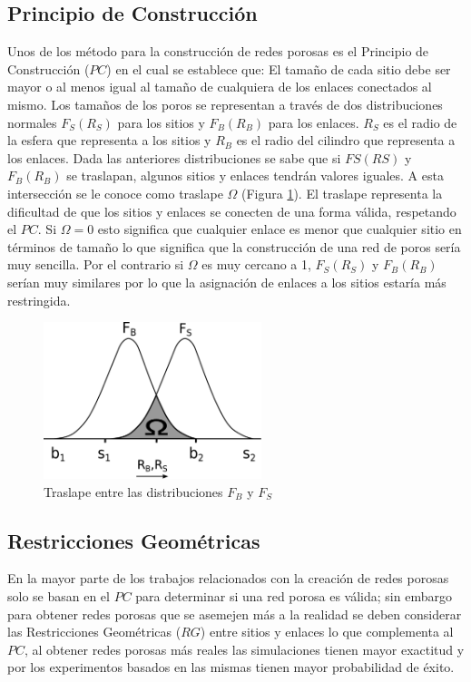 \subsection{Principio de Construcción}
Unos de los método para la construcción de redes porosas es el Principio de Construcción ($PC$) en el cual se establece que: El tamaño de cada sitio debe ser mayor o al menos igual al tamaño de cualquiera de los enlaces conectados al mismo. Los tamaños de los poros se representan a través de dos distribuciones normales $F_S(R_S)$ para los sitios y $F_B(R_B)$ para los enlaces. $R_S$ es el radio de la esfera que representa a los sitios y $R_B$ es el radio del cilindro que representa a los enlaces. Dada las anteriores distribuciones se sabe que si $FS(RS)$ y $F_B(R_B)$ se traslapan, algunos sitios y enlaces tendrán valores iguales. A esta intersección se le conoce como traslape $\Omega$ (Figura \ref{fig:overlap}). El traslape representa la dificultad de que los sitios y enlaces se conecten de una forma válida, respetando el $PC$. Si $\Omega=0$ esto significa que cualquier enlace es menor que cualquier sitio en términos de tamaño lo que significa que la construcción de una red de poros sería muy sencilla. Por el contrario si $\Omega$ es muy cercano a 1, $F_S(R_S)$ y $F_B(R_B)$ serían muy similares por lo que la asignación de enlaces a los sitios estaría más restringida.\\

\begin{figure}[hbtp]
\centering
\includegraphics[width=2.5in]{img/traslape.pdf}
\caption{Traslape entre las distribuciones \textit{$F_B$} y $F_S$}
\label{fig:overlap}
\end{figure}

\subsection{Restricciones Geométricas}
\label{subsec:gr}

En la mayor parte de los trabajos relacionados con la creación de redes porosas solo se basan en el $PC$ para determinar si una red porosa es válida; sin embargo para obtener redes porosas que se asemejen más a la realidad se deben considerar las Restricciones Geométricas ($RG$) entre sitios y enlaces lo que complementa al $PC$, al obtener redes porosas más reales las simulaciones tienen mayor exactitud y por los experimentos basados en las mismas tienen mayor probabilidad de éxito.\\

